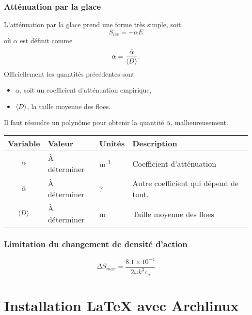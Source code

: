 \documentclass[10pt]{article}
\numberwithin{equation}{section}
\begin{document}
\subsubsection{Atténuation par la glace}
\label{sec:org3a57f89}

L'atténuation par la glace prend une forme très simple, soit
\begin{equation}
   S_{ice} = -\alpha E
\end{equation}
où \(\alpha\) est définit comme
\begin{equation}
   \alpha = \frac{\bar{\alpha}}{\expval{D}}.
\end{equation}
Officiellement les quantités précédentes sont
\begin{itemize}
\item \(\bar{\alpha}\), soit un coefficient d'atténuation empirique,
\item \(\expval{D}\), la taille moyenne des floes.
\end{itemize}
Il faut résoudre un polynôme pour obtenir la quantité \(\bar{\alpha}\), malheureusement.

\begin{center}
\begin{tabular}{clll}
Variable & Valeur & Unités & Description\\
\hline
\(\alpha\) & À déterminer & m\textsuperscript{-1} & Coefficient d'atténuation\\
\(\bar{\alpha}\) & À déterminer & ? & Autre coefficient qui dépend de tout.\\
\(\expval{D}\) & À déterminer & m & Taille moyenne des floes\\
\end{tabular}
\end{center}
\subsubsection{Limitation du changement de densité d'action}
\label{sec:org5731ecf}

\begin{equation}
   \Delta S_{max} = \frac{8.1\times10^{-4}}{2\omega k^3 c_g}
\end{equation}
\section{Installation \LaTeX{} avec Archlinux}
\label{sec:orgdd18d34}
\end{document}
